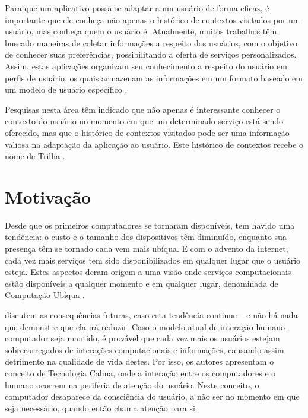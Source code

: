 Para que um aplicativo possa se adaptar a um usuário de forma eficaz, é importante que ele conheça não apenas o histórico de contextos visitados por um usuário, mas conheça quem o usuário é. Atualmente, muitos trabalhos têm buscado maneiras de coletar informações a respeito dos usuários, com o objetivo de conhecer suas preferências, possibilitando a oferta de serviços personalizados. Assim, estas aplicações organizam seu conhecimento a respeito do usuário em perfis de usuário, os quais armazenam as informações em um formato baseado em um modelo de usuário específico \cite{viviani10}.

Pesquisas nesta área têm indicado que não apenas é interessante conhecer o contexto do usuário no momento em que um determinado serviço está sendo oferecido, mas que o histórico de contextos visitados pode ser uma informação valiosa na adaptação da aplicação ao usuário. Este histórico de contextos recebe o nome de Trilha \cite{silva10}.



\section{Motivação}
\label{sec:motivacao}

Desde que os primeiros computadores se tornaram disponíveis, tem havido uma tendência: o custo e o tamanho dos dispositivos têm diminuído, enquanto sua presença têm se tornado cada vem mais ubíqua. E com o advento da internet, cada vez mais serviços tem sido disponibilizados em qualquer lugar que o usuário esteja. Estes aspectos deram origem a uma visão onde serviços computacionais estão disponíveis a qualquer momento e em qualquer lugar, denominada de Computação Ubíqua \cite{weiser91}.

 discutem as consequências futuras, caso esta tendência continue -- e não há nada que demonstre que ela irá reduzir. Caso o modelo atual de interação humano-computador seja mantido, é provável que cada vez mais os usuários estejam sobrecarregados de interações computacionais e informações, causando assim detrimento na qualidade de vida destes. Por isso, os autores apresentam o conceito de Tecnologia Calma, onde a interação entre os computadores e o humano ocorrem na periferia de atenção do usuário. Neste conceito, o computador desaparece da consciência do usuário, a não ser no momento em que seja necessário, quando então chama atenção para si.

